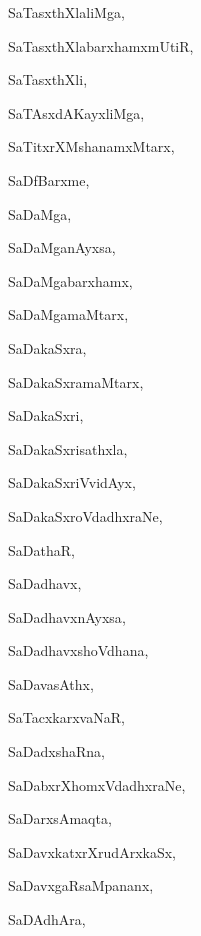 \begin{multicols}{3}
{\noindent
{SaTasxthXlaliMga}, \pageref{SaTasxthXlaliMga}

\noindent
{SaTasxthXlabarxhamxmUtiR}, \pageref{SaTasxthXlabarxhamxmUtiR}

\noindent
{SaTasxthXli}, \pageref{SaTasxthXli}

\noindent
{SaTAsxdAKayxliMga}, \pageref{SaTAsxdAKayxliMga}

\noindent
{SaTitxrXMshanamxMtarx}, \pageref{SaTitxrXMshanamxMtarx}

\noindent
{SaDfBarxme}, \pageref{SaDfBarxme}

\noindent
{SaDaMga}, \pageref{SaDaMga}

\noindent
{SaDaMganAyxsa}, \pageref{SaDaMganAyxsa}

\noindent
{SaDaMgabarxhamx}, \pageref{SaDaMgabarxhamx}

\noindent
{SaDaMgamaMtarx}, \pageref{SaDaMgamaMtarx}

\noindent
{SaDakaSxra}, \pageref{SaDakaSxra}

\noindent
{SaDakaSxramaMtarx}, \pageref{SaDakaSxramaMtarx}

\noindent
{SaDakaSxri}, \pageref{SaDakaSxri}

\noindent
{SaDakaSxrisathxla}, \pageref{SaDakaSxrisathxla}

\noindent
{SaDakaSxriVvidAyx}, \pageref{SaDakaSxriVvidAyx}

\noindent
{SaDakaSxroVdadhxraNe}, \pageref{SaDakaSxroVdadhxraNe}

\noindent
{SaDathaR}, \pageref{SaDathaR}

\noindent
{SaDadhavx}, \pageref{SaDadhavx}

\noindent
{SaDadhavxnAyxsa}, \pageref{SaDadhavxnAyxsa}

\noindent
{SaDadhavxshoVdhana}, \pageref{SaDadhavxshoVdhana}

\noindent
{SaDavasAthx}, \pageref{SaDavasAthx}

\noindent
{SaTacxkarxvaNaR}, \pageref{SaTacxkarxvaNaR}

\noindent
{SaDadxshaRna}, \pageref{SaDadxshaRna}

\noindent
{SaDabxrXhomxVdadhxraNe}, \pageref{SaDabxrXhomxVdadhxraNe}

\noindent
{SaDarxsAmaqta}, \pageref{SaDarxsAmaqta}

\noindent
{SaDavxkatxrXrudArxkaSx}, \pageref{SaDavxkatxrXrudArxkaSx}

\noindent
{SaDavxgaRsaMpananx}, \pageref{SaDavxgaRsaMpananx}

\noindent
{SaDAdhAra}, \pageref{SaDAdhAra}

}
\end{multicols}
